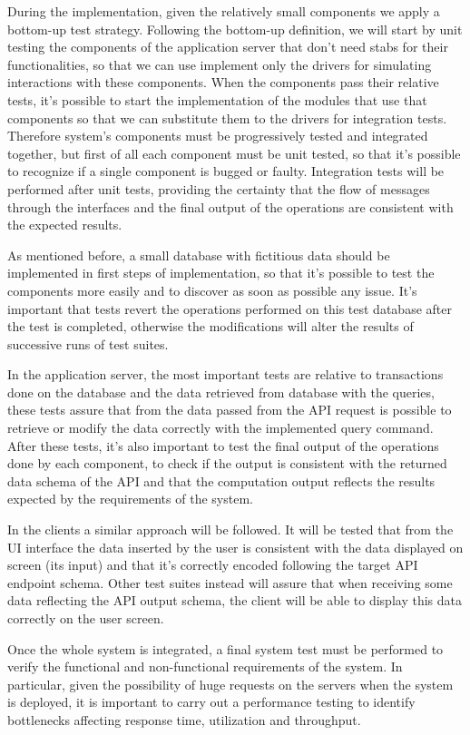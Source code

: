 During the implementation, given the relatively small components we apply a bottom-up test strategy. Following the bottom-up definition, we will start by unit testing the components of the application server that don't need stabs for their functionalities, so that we can use implement only the drivers for simulating interactions with these components. When the components pass their relative tests, it's possible to start the implementation of the modules that use that components so that we can substitute them to the drivers for integration tests. Therefore system's components must be progressively tested and integrated together, but first of all each component must be unit tested, so that it's possible to recognize if a single component is bugged or faulty. Integration tests will be performed after unit tests, providing the certainty that the flow of messages through the interfaces and the final output of the operations are consistent with the expected results.

As mentioned before, a small database with fictitious data should be implemented in first steps of implementation, so that it's possible to test the components more easily and to discover as soon as possible any issue. It's important that tests revert the operations performed on this test database after the test is completed, otherwise the modifications will alter the results of successive runs of test suites.

In the application server, the most important tests are relative to transactions done on the database and the data retrieved from database with the queries, these tests assure that from the data passed from the API request is possible to retrieve or modify the data correctly with the implemented query command. After these tests, it's also important to test the final output of the operations done by each component, to check if the output is consistent with the returned data schema of the API and that the computation output reflects the results expected by the requirements of the system.

In the clients a similar approach will be followed. It will be tested that from the UI interface the data inserted by the user is consistent with the data displayed on screen (its input) and that it's correctly encoded following the target API endpoint schema. Other test suites instead will assure that when receiving some data reflecting the API output schema, the client will be able to display this data correctly on the user screen. 

Once the whole system is integrated, a final system test must be performed to verify the functional and non-functional requirements of the system. In particular, given the possibility of huge requests on the servers when the system is deployed, it is important to carry out a performance testing to identify bottlenecks affecting response time, utilization and throughput.